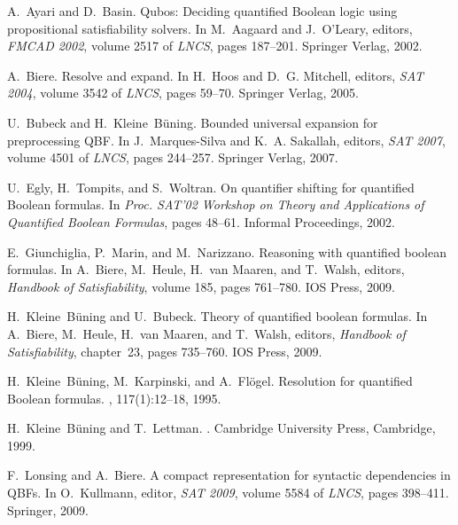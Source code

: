 \documentclass{llncs}
\begin{document}
\begin{thebibliography}{10}

A.~Ayari and D.~Basin.
\newblock Qubos: Deciding quantified {B}oolean logic using propositional
  satisfiability solvers.
\newblock In M.~Aagaard and J.~O'Leary, editors, {\em FMCAD 2002}, volume 2517
  of {\em LNCS}, pages 187--201. Springer Verlag,
  2002.

 A.~Biere.  \newblock Resolve and expand.  \newblock In
  H.~Hoos and D.~G. Mitchell, editors, {\em SAT 2004}, volume 3542 of {\em
    LNCS}, pages 59--70. Springer Verlag, 2005.

 U.~Bubeck and H.~Kleine~B\"{u}ning.  \newblock
  Bounded universal expansion for preprocessing {QBF}.  \newblock In
  J.~Marques-Silva and K.~A. Sakallah, editors, {\em SAT 2007}, volume 4501 of
  {\em LNCS}, pages 244--257. Springer Verlag,
  2007.



U.~Egly, H.~Tompits, and S.~Woltran.
\newblock On quantifier shifting for quantified {Boolean} formulas.
\newblock In {\em Proc. SAT'02 Workshop on Theory and Applications of
  Quantified Boolean Formulas}, pages 48--61. Informal Proceedings, 2002.

E.~Giunchiglia, P.~Marin, and M.~Narizzano.
\newblock Reasoning with quantified boolean formulas.
\newblock In A.~Biere, M.~Heule, H.~van Maaren, and T.~Walsh, editors, {\em
  Handbook of Satisfiability}, volume 185, pages 761--780. IOS Press, 2009.

H.~Kleine~B{\"u}ning and U.~Bubeck.
\newblock Theory of quantified boolean formulas.
\newblock In A.~Biere, M.~Heule, H.~van Maaren, and T.~Walsh, editors, {\em
  Handbook of Satisfiability}, chapter~23, pages 735--760. IOS Press, 2009.

H.~Kleine~B\"uning, M.~Karpinski, and A.~Fl\"ogel.
\newblock Resolution for quantified {Boolean} formulas.
, 117(1):12--18, 1995.

H.~Kleine~B{\"u}ning and T.~Lettman.
.
\newblock Cambridge University Press, Cambridge, 1999.

F.~Lonsing and A.~Biere.
\newblock A compact representation for syntactic dependencies in {QBFs}.
\newblock In O.~Kullmann, editor, {\em SAT 2009}, volume 5584 of {\em LNCS}, pages
  398--411. Springer, 2009.


\end{thebibliography}
\end{document}
